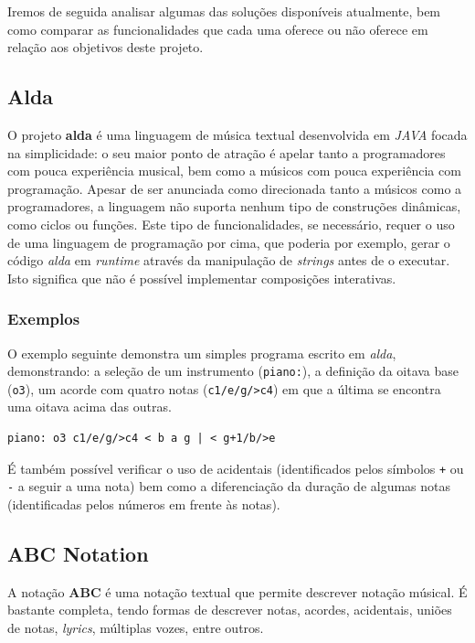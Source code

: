 \documentclass[
  oneside,
  11pt, a4paper,
  footinclude=true,
  headinclude=true,
  cleardoublepage=empty
]{scrbook}
\begin{document}
	Iremos de seguida analisar algumas das soluções disponíveis atualmente, bem como comparar as funcionalidades que cada uma oferece ou não oferece em relação aos objetivos deste projeto.
	\subsection{Alda}
	O projeto \textbf{alda}\cite{alda} é uma linguagem de música textual desenvolvida em \textit{JAVA} focada na simplicidade: o seu maior ponto de atração é apelar tanto a programadores com pouca experiência musical, bem como a músicos com pouca experiência com programação.
    Apesar de ser anunciada como direcionada tanto a músicos como a programadores, a linguagem não suporta nenhum tipo de construções dinâmicas, como ciclos ou funções. Este tipo de funcionalidades, se necessário, requer o uso de uma linguagem de programação por cima, que poderia por exemplo, gerar o código \textit{alda} em \textit{runtime} através da manipulação de \textit{strings} antes de o executar. Isto significa que não é possível implementar composições interativas.
	
	\subsubsection{Exemplos}
	O exemplo seguinte demonstra um simples programa escrito em \textit{alda}, demonstrando: a seleção de um instrumento (\texttt{piano:}), a definição da oitava base (\texttt{o3}), um acorde com quatro notas (\texttt{c1/e/g/>c4}) em que a última se encontra uma oitava acima das outras.
\begin{lstlisting}[backgroundcolor=\color{transparent},caption={Exemplo da linguagem alda},captionpos=b,xleftmargin=.28\textwidth]
piano: o3 c1/e/g/>c4 < b a g | < g+1/b/>e
\end{lstlisting}
 É também possível verificar o uso de acidentais (identificados pelos símbolos \texttt{+} ou \texttt{-} a seguir a uma nota) bem como a diferenciação da duração de algumas notas (identificadas pelos números em frente às notas).
	\subsection{ABC Notation}
	A notação \textbf{ABC}\cite{abc-notation} é uma notação textual que permite descrever notação músical. É bastante completa, tendo formas de descrever notas, acordes, acidentais, uniões de notas, \textit{lyrics}, múltiplas vozes, entre outros.
	
\end{document}
